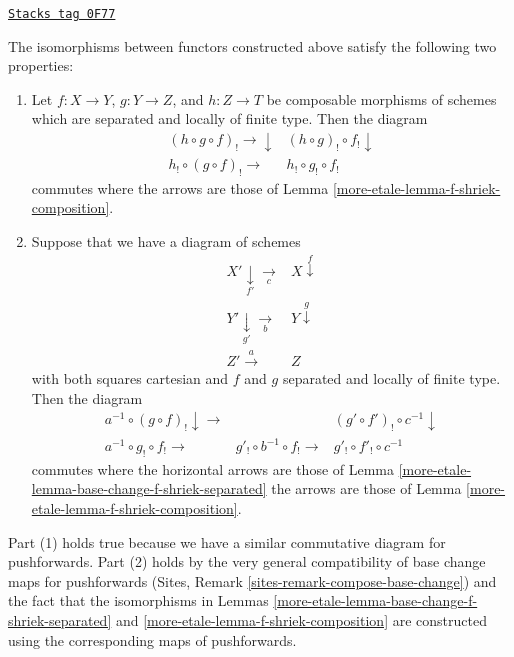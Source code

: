 \begin{remark}
\label{more-etale-remark-f-shriek-base-change-composition}
\href{https://stacks.math.columbia.edu/tag/0F77}{\texttt{Stacks tag 0F77}}

The isomorphisms between functors
constructed above satisfy the following two properties:
\begin{enumerate}
\item Let $f : X \to Y$, $g : Y \to Z$, and $h : Z \to T$ be composable
morphisms of schemes which are separated and locally of finite type.
Then the diagram
$$
\begin{array}{cc}(h \circ g \circ f)_! \longrightarrow\downarrow & (h \circ g)_! \circ f_! \downarrow \\ h_! \circ (g \circ f)_! \longrightarrow & h_! \circ g_! \circ f_!\end{array}
$$
commutes where the arrows are those of Lemma \ref{more-etale-lemma-f-shriek-composition}.
\item Suppose that we have a diagram of schemes
$$
\begin{array}{cc}X' \underset{f'}{\downarrow}\underset{c}{\longrightarrow} & X \overset{f}{\downarrow} \\ Y' \underset{g'}{\downarrow}\underset{b}{\longrightarrow} & Y \overset{g}{\downarrow} \\ Z' \overset{a}{\longrightarrow} & Z\end{array}
$$
with both squares cartesian and $f$ and $g$ separated and
locally of finite type. Then the diagram
$$
\begin{array}{ccc}a^{-1} \circ (g \circ f)_! \downarrow\longrightarrow &  & (g' \circ f')_! \circ c^{-1} \downarrow \\ a^{-1} \circ g_! \circ f_! \longrightarrow & g'_! \circ b^{-1} \circ f_! \longrightarrow & g'_! \circ f'_! \circ c^{-1}\end{array}
$$
commutes where the horizontal arrows are those of
Lemma \ref{more-etale-lemma-base-change-f-shriek-separated}
the arrows are those of Lemma \ref{more-etale-lemma-f-shriek-composition}.
\end{enumerate}
Part (1) holds true because we have a similar commutative
diagram for pushforwards. Part (2) holds by the very general
compatibility of base change maps for pushforwards
(Sites, Remark \ref{sites-remark-compose-base-change})
and the fact that the isomorphisms in
Lemmas \ref{more-etale-lemma-base-change-f-shriek-separated} and
\ref{more-etale-lemma-f-shriek-composition}
are constructed using the corresponding maps of pushforwards.
\end{remark}


